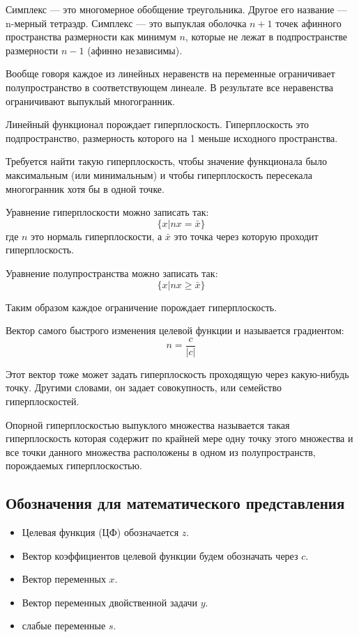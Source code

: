 \documentclass[a4paper,article,14pt]{extarticle}
\begin{document}
Симплекс --- это многомерное обобщение треугольника.
Другое его название --- n-мерный тетраэдр.
Симплекс --- это выпуклая оболочка \(n+1\) точек афинного пространства размерности как минимум \(n\), которые не лежат в подпространстве размерности \(n-1\) (афинно независимы).

Вообще говоря каждое из линейных неравенств на переменные ограничивает полупространство в соответствующем линеале.
В результате все неравенства ограничивают выпуклый многогранник.

Линейный функционал порождает гиперплоскость.
Гиперплоскость это подпространство, размерность которого на 1 меньше исходного пространства.

Требуется найти такую гиперплоскость, чтобы значение функционала было максимальным (или минимальным) и чтобы гиперплоскость пересекала многогранник хотя бы в одной точке.

Уравнение гиперплоскости можно записать так:
\begin{equation}
    \{x | nx = \bar x\}
\end{equation}
где \(n\) это нормаль гиперплоскости, а \(\bar x\) это точка через которую проходит гиперплоскость.

Уравнение полупространства можно записать так:
\begin{equation}
    \{x | nx \ge \bar x\}
\end{equation}

Таким образом каждое ограничение порождает гиперплоскость.

Вектор самого быстрого изменения целевой функции и называется градиентом:
\begin{equation}
n = \frac c {|c|}
\end{equation}

Этот вектор тоже может задать гиперплоскость проходящую через какую-нибудь точку.
Другими словами, он задает совокупность, или семейство гиперплоскостей.

Опорной гиперплоскостью выпуклого множества называется такая гиперплоскость которая содержит по крайней мере одну точку этого множества и все точки данного множества расположены в одном из полупространств, порождаемых гиперплоскостью.

\subsection{Обозначения для математического представления}

\begin{itemize}
    \item Целевая функция (ЦФ) обозначается \(z\).
    \item Вектор коэффициентов целевой функции будем обозначать через \(c\).
    \item Вектор переменных \(x\).
    \item Вектор переменных двойственной задачи \(y\).
    \item слабые переменные \(s\).
\end{itemize}
\end{document}
